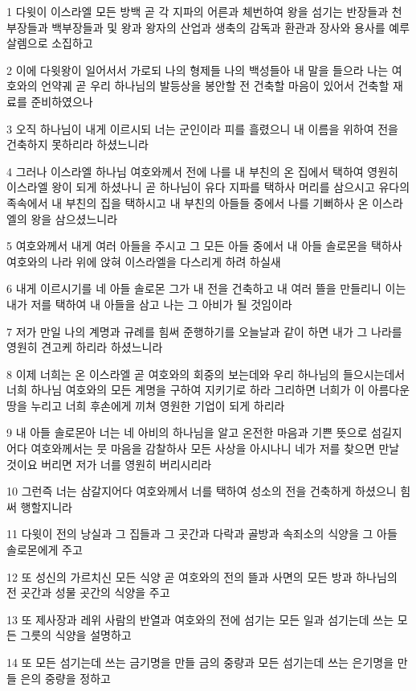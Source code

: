 \par 1 다윗이 이스라엘 모든 방백 곧 각 지파의 어른과 체번하여 왕을 섬기는 반장들과 천부장들과 백부장들과 및 왕과 왕자의 산업과 생축의 감독과 환관과 장사와 용사를 예루살렘으로 소집하고
\par 2 이에 다윗왕이 일어서서 가로되 나의 형제들 나의 백성들아 내 말을 들으라 나는 여호와의 언약궤 곧 우리 하나님의 발등상을 봉안할 전 건축할 마음이 있어서 건축할 재료를 준비하였으나
\par 3 오직 하나님이 내게 이르시되 너는 군인이라 피를 흘렸으니 내 이름을 위하여 전을 건축하지 못하리라 하셨느니라
\par 4 그러나 이스라엘 하나님 여호와께서 전에 나를 내 부친의 온 집에서 택하여 영원히 이스라엘 왕이 되게 하셨나니 곧 하나님이 유다 지파를 택하사 머리를 삼으시고 유다의 족속에서 내 부친의 집을 택하시고 내 부친의 아들들 중에서 나를 기뻐하사 온 이스라엘의 왕을 삼으셨느니라
\par 5 여호와께서 내게 여러 아들을 주시고 그 모든 아들 중에서 내 아들 솔로몬을 택하사 여호와의 나라 위에 앉혀 이스라엘을 다스리게 하려 하실새
\par 6 내게 이르시기를 네 아들 솔로몬 그가 내 전을 건축하고 내 여러 뜰을 만들리니 이는 내가 저를 택하여 내 아들을 삼고 나는 그 아비가 될 것임이라
\par 7 저가 만일 나의 계명과 규례를 힘써 준행하기를 오늘날과 같이 하면 내가 그 나라를 영원히 견고케 하리라 하셨느니라
\par 8 이제 너희는 온 이스라엘 곧 여호와의 회중의 보는데와 우리 하나님의 들으시는데서 너희 하나님 여호와의 모든 계명을 구하여 지키기로 하라 그리하면 너희가 이 아름다운 땅을 누리고 너희 후손에게 끼쳐 영원한 기업이 되게 하리라
\par 9 내 아들 솔로몬아 너는 네 아비의 하나님을 알고 온전한 마음과 기쁜 뜻으로 섬길지어다 여호와께서는 뭇 마음을 감찰하사 모든 사상을 아시나니 네가 저를 찾으면 만날 것이요 버리면 저가 너를 영원히 버리시리라
\par 10 그런즉 너는 삼갈지어다 여호와께서 너를 택하여 성소의 전을 건축하게 하셨으니 힘써 행할지니라
\par 11 다윗이 전의 낭실과 그 집들과 그 곳간과 다락과 골방과 속죄소의 식양을 그 아들 솔로몬에게 주고
\par 12 또 성신의 가르치신 모든 식양 곧 여호와의 전의 뜰과 사면의 모든 방과 하나님의 전 곳간과 성물 곳간의 식양을 주고
\par 13 또 제사장과 레위 사람의 반열과 여호와의 전에 섬기는 모든 일과 섬기는데 쓰는 모든 그릇의 식양을 설명하고
\par 14 또 모든 섬기는데 쓰는 금기명을 만들 금의 중량과 모든 섬기는데 쓰는 은기명을 만들 은의 중량을 정하고
